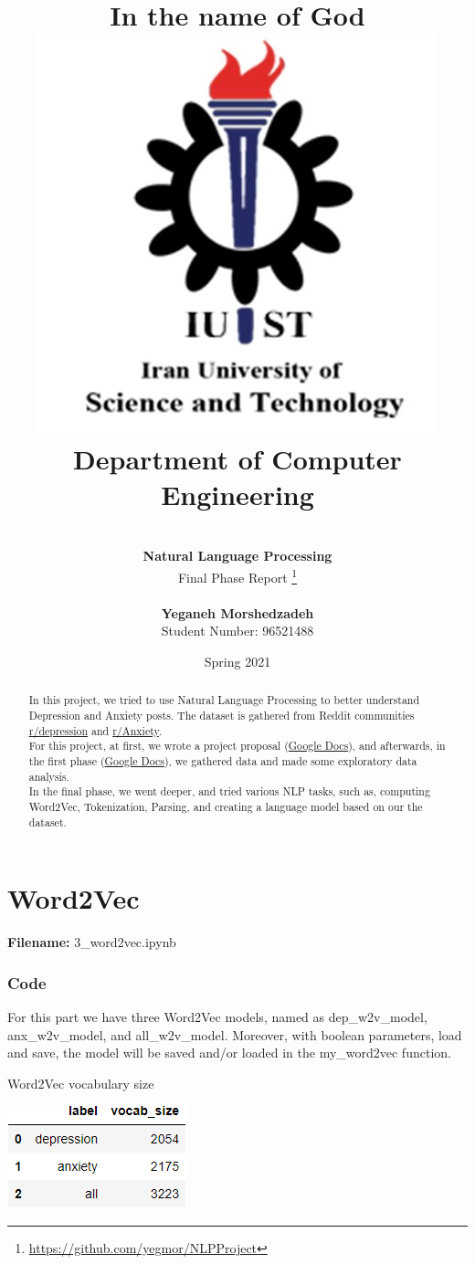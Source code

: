 \documentclass[12pt, a4paper]{article}
\title{
	{\Huge \textbf{In the name of God}}
	\\[20pt]
	\includegraphics[width=0.5\linewidth]{../assets/IUST_logo_color_eng.jpg} \\
	{\normalsize Department of Computer Engineering}
}
\author{
	\\[10pt]
	\textbf{{\LARGE Natural Language Processing}}
	\\[10pt]
	\LARGE Final Phase Report
	\thanks{\url{https://github.com/yegmor/NLPProject}}
	
	\\[30pt]
	\textbf{Yeganeh Morshedzadeh}
	\\[5pt]
	Student Number: 96521488
}
\date{Spring 2021}
\begin{document}
	
\maketitle
	
\clearpage
\tableofcontents
\newpage

\listoffigures
\newpage

\listoftables
\newpage

\begin{abstract}
	In this project, we tried to use Natural Language Processing to better understand Depression and Anxiety posts. The dataset is gathered from Reddit communities \href{https://www.reddit.com/r/depression}{r/depression} and \href{https://www.reddit.com/r/Anxiety}{r/Anxiety}.
	\\[10pt]
	
	For this project, at first, we wrote a project proposal (\href{https://docs.google.com/document/d/1tHGEmEgn8-sp8MD72d8NjnZsq-GpVupzsMWgnqaGi-Y/edit?usp=sharing}{Google Docs}), and afterwards, in the first phase (\href{https://docs.google.com/document/d/1Jc2ELhweU01Tbf0WalU7wVQABdAV4w50mhQnmMpU2mM/edit?usp=sharing}{Google Docs}), we gathered data and made some exploratory data analysis. 
	\\[10pt]
	
	In the final phase, we went deeper, and tried various NLP tasks, such as, computing Word2Vec, Tokenization, Parsing, and creating a language model based on our the dataset.
\end{abstract}

\newpage
\part{Word2Vec}
\large{\textbf{Filename:} 3\_word2vec.ipynb}

\section*{Code}
For this part we have three Word2Vec models, named as dep\_w2v\_model, anx\_w2v\_model, and all\_w2v\_model. Moreover, with boolean parameters, load and save, the model will be saved and/or loaded in the my\_word2vec function.

\begin{table}[ht]
	\caption{Word2Vec vocabulary size} 
	\centering 
	\vspace{5mm} 
	\includegraphics[width=0.5\linewidth]{../reports/images/w2v_vocab-size.png}
	\label{table:nonlin} 
\end{table}
\end{document}
